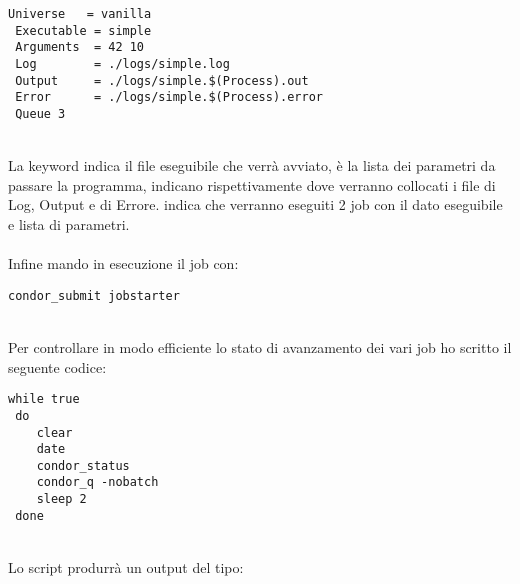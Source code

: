 \begin{lstlisting}[style=cmd]
 Universe   = vanilla
 Executable = simple
 Arguments  = 42 10
 Log        = ./logs/simple.log
 Output     = ./logs/simple.$(Process).out
 Error      = ./logs/simple.$(Process).error
 Queue 3
\end{lstlisting}
\ \\
La keyword  indica il file eseguibile che verr\`{a} avviato,  \`{e} la lista dei parametri da passare la programma,  indicano rispettivamente dove verranno collocati i file di Log, Output e di Errore.  indica che verranno eseguiti 2 job con il dato eseguibile e lista di parametri.\\
\ \\
Infine mando in esecuzione il job con: 

\begin{lstlisting}[style=cmd]
 condor_submit jobstarter
\end{lstlisting}
\ \\
Per controllare in modo efficiente lo stato di avanzamento dei vari job ho scritto il seguente codice:

\begin{lstlisting}[style=bash]
 while true
 do
    clear
    date
    condor_status
    condor_q -nobatch
    sleep 2
 done
\end{lstlisting}
\ \\
Lo script produrr\`{a} un output del tipo:

